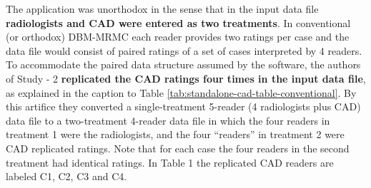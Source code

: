 \documentclass[
]{book}
\begin{document}
The application was unorthodox in the sense that in the input data file \textbf{radiologists and CAD were entered as two treatments}. In conventional (or orthodox) DBM-MRMC each reader provides two ratings per case and the data file would consist of paired ratings of a set of cases interpreted by 4 readers. To accommodate the paired data structure assumed by the software, the authors of Study - 2 \textbf{replicated the CAD ratings four times in the input data file}, as explained in the caption to Table \ref{tab:standalone-cad-table-conventional}. By this artifice they converted a single-treatment 5-reader (4 radiologists plus CAD) data file to a two-treatment 4-reader data file in which the four readers in treatment 1 were the radiologists, and the four ``readers'' in treatment 2 were CAD replicated ratings. Note that for each case the four readers in the second treatment had identical ratings. In Table 1 the replicated CAD readers are labeled C1, C2, C3 and C4.
\end{document}
